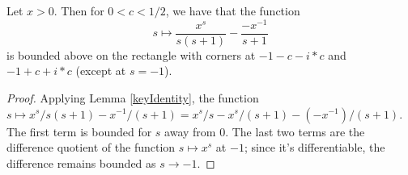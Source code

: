 \begin{lemma}[diffBddAtNegOne]
\label{diffBddAtNegOne}
\leanok
Let $x>0$. Then for $0 < c < 1 /2$, we have that the function
  $$
  s ↦ \frac{x^s}{s(s+1)} - \frac{-x^{-1}}{s+1}
  $$
  is bounded above on the rectangle with corners at $-1-c-i*c$ and $-1+c+i*c$ (except at $s=-1$).
\end{lemma}
\begin{proof}
\leanok
Applying Lemma \ref{keyIdentity}, the
   function $s ↦ x^s/s(s+1) - x^{-1}/(s+1) = x^s/s - x^s/(s+1) - (-x^{-1})/(s+1)$. The first term
   is bounded for $s$
   away from $0$. The last two terms are the difference quotient of the function $s ↦ x^s$ at
   $-1$; since it's differentiable, the difference remains bounded as $s\to -1$.
\end{proof}
